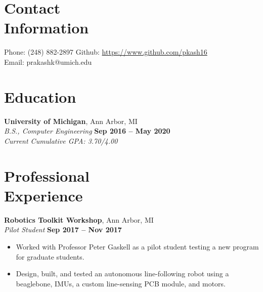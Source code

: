 \documentclass[margin,line]{resume}
\begin{document}
\begin{resume}
    \section{\mysidestyle Contact\\Information}

    Phone: (248) 882-2897       \hfill Github: \url{https://www.github.com/pkash16} \\
    \noindent Email: prakashk@umich.edu  \vspace{0mm}\\\vspace{-4.5mm}

    \section{\mysidestyle Education}

    \textbf{University of Michigan}, Ann Arbor, MI \vspace{2mm}\\\vspace{1mm}%
    \textsl{B.S., Computer Engineering} \hfill \textbf{Sep 2016 -- May 2020}\\
   	\emph{Current Cumulative GPA: 3.70/4.00}

    \section{\mysidestyle Professional\\Experience}
    
    \textbf{Robotics Toolkit Workshop}, Ann Arbor, MI \vspace{2mm}\\\vspace{1mm}%
    \textsl{Pilot Student} \hfill \textbf{Sep 2017 -- Nov 2017}
    \begin{itemize}
    	\item Worked with Professor Peter Gaskell as a pilot student testing a new program for graduate students.
    	\item Design, built, and tested an autonomous line-following robot using a beaglebone, IMUs, a custom line-sensing PCB module, and motors.
    \end{itemize}


\end{resume}
\end{document}
